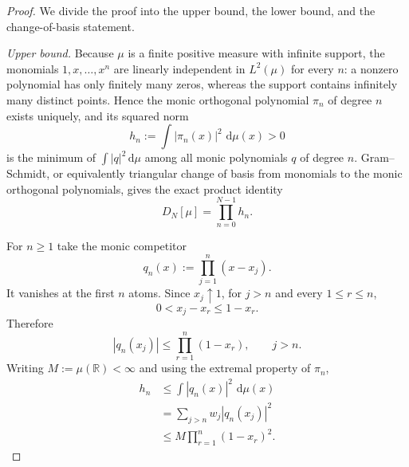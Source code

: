 \documentclass[11pt]{amsart}
\numberwithin{equation}{section}
\theoremstyle{plain}
\theoremstyle{definition}
\theoremstyle{remark}
\newcommand{\dd}{\,\mathrm d}
\begin{document}
\begin{proof}
We divide the proof into the upper bound, the lower bound, and the change-of-basis statement.

\emph{Upper bound.}
Because $\mu$ is a finite positive measure with infinite support, the monomials $1,x,\ldots,x^n$ are linearly independent in $L^2(\mu)$ for every $n$: a nonzero polynomial has only finitely many zeros, whereas the support contains infinitely many distinct points.  Hence the monic orthogonal polynomial $\pi_n$ of degree $n$ exists uniquely, and its squared norm
\begin{equation}
h_n:=\int |\pi_n(x)|^2\,\dd\mu(x)>0
\end{equation}
is the minimum of $\int|q|^2\dd\mu$ among all monic polynomials $q$ of degree $n$.  Gram--Schmidt, or equivalently triangular change of basis from monomials to the monic orthogonal polynomials, gives the exact product identity
\begin{equation}
D_N[\mu]=\prod_{n=0}^{N-1}h_n.
\label{eq:abstract_D_product_h}
\end{equation}

For $n\ge1$ take the monic competitor
\begin{equation}
q_n(x):=\prod_{j=1}^{n}(x-x_j).
\end{equation}
It vanishes at the first $n$ atoms.  Since $x_j\uparrow1$, for $j>n$ and every $1\le r\le n$,
\begin{equation}
0<x_j-x_r\le1-x_r.
\end{equation}
Therefore
\begin{equation}
|q_n(x_j)|\le\prod_{r=1}^{n}(1-x_r),\qquad j>n.
\end{equation}
Writing $M:=\mu(\mathbb R)<\infty$ and using the extremal property of $\pi_n$,
\begin{align}
h_n
&\le\int |q_n(x)|^2\,\dd\mu(x)\\
&=\sum_{j>n}w_j|q_n(x_j)|^2\\
&\le M\prod_{r=1}^{n}(1-x_r)^2.
\label{eq:abstract_monic_upper}
\end{align}


\end{proof}
\end{document}
